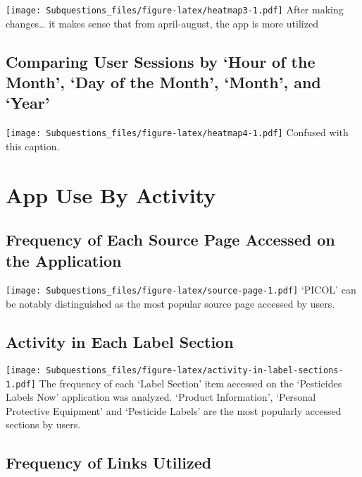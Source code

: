 \documentclass[
]{article}
\begin{document}
\texttt{[image: Subquestions\_files/figure-latex/heatmap3-1.pdf]} After
making changes\ldots{} it makes sense that from april-august, the app is
more utilized

\hypertarget{comparing-user-sessions-by-hour-of-the-month-day-of-the-month-month-and-year}{%
\subsection{Comparing User Sessions by `Hour of the Month', `Day of the
Month', `Month', and
`Year'}\label{comparing-user-sessions-by-hour-of-the-month-day-of-the-month-month-and-year}}

\texttt{[image: Subquestions\_files/figure-latex/heatmap4-1.pdf]}
Confused with this caption.

\hypertarget{app-use-by-activity}{%
\section{App Use By Activity}\label{app-use-by-activity}}

\hypertarget{frequency-of-each-source-page-accessed-on-the-application}{%
\subsection{Frequency of Each Source Page Accessed on the
Application}\label{frequency-of-each-source-page-accessed-on-the-application}}

\texttt{[image: Subquestions\_files/figure-latex/source-page-1.pdf]}
`PICOL' can be notably distinguished as the most popular source page
accessed by users.

\hypertarget{activity-in-each-label-section}{%
\subsection{Activity in Each Label
Section}\label{activity-in-each-label-section}}

\texttt{[image: Subquestions\_files/figure-latex/activity-in-label-sections-1.pdf]}
The frequency of each `Label Section' item accessed on the `Pesticides
Labels Now' application was analyzed. `Product Information', `Personal
Protective Equipment' and `Pesticide Labels' are the most popularly
accessed sections by users.

\hypertarget{frequency-of-links-utilized}{%
\subsection{Frequency of Links
Utilized}\label{frequency-of-links-utilized}}
\end{document}

